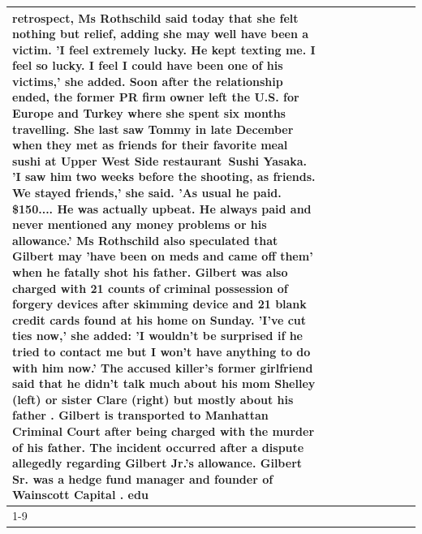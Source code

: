 \begin{table}[H]
\begin{tabular}{lllrlllll}
retrospect, Ms Rothschild said today that she felt nothing but relief, adding she may well have been a victim. 'I feel extremely lucky. He kept texting me. I feel so lucky. I feel I could have been one of his victims,' she added. Soon after the relationship ended, the former PR firm owner left the U.S. for Europe and Turkey where she spent six months  travelling. She last saw Tommy in late December when they met as friends for their favorite meal sushi at Upper West Side restaurant Sushi Yasaka. 'I saw him two weeks before the shooting, as friends. We stayed friends,' she said. 'As usual he paid. \$150.... He was actually upbeat. He always paid and never mentioned any money problems or his allowance.' Ms Rothschild also speculated that Gilbert may 'have been on meds and came off them' when he fatally shot his father. Gilbert was also charged with 21 counts of criminal possession of forgery devices after skimming device and 21 blank credit cards found at his home on Sunday. 'I've cut ties now,' she added: 'I wouldn’t be surprised if he tried to contact me but I won’t have anything to do with him now.' The accused killer's former girlfriend said that he didn't talk much about his mom Shelley (left) or sister Clare (right) but mostly about his father . Gilbert is transported to Manhattan Criminal Court  after being charged with the murder of his father. The incident occurred after a dispute allegedly regarding Gilbert Jr.'s allowance. Gilbert Sr. was a hedge fund manager and founder of Wainscott Capital . edu \\
\cline{1-9}

\end{tabular}
\end{table}
